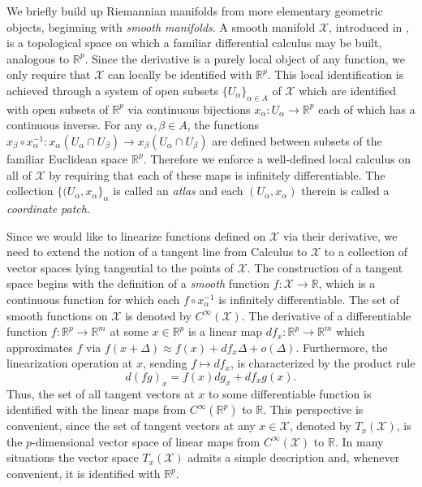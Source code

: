 \documentclass[anon,12pt]{colt2021} %
\newcommand{\rr}{{\mathbb{R}}}
\newcommand{\rrflex}[1]{{\ensuremath{\rr^{#1}
}}}
\newcommand{\rrm}{{\rrflex{m}}}
\newcommand{\rrp}{{\rrflex{p}}}
\newcommand{\xxx}{\mathcal{X}}
\begin{document}
We briefly build up Riemannian manifolds from more elementary geometric objects, beginning with \textit{smooth manifolds}.  A smooth manifold $\xxx$, introduced in \cite{RiemannOriginal}, is a topological space on which a familiar differential calculus may be built, analogous to $\rrp$.  Since the derivative is a purely local object of any function, we only require that $\xxx$ can locally be identified with $\rrp$.  This local identification is achieved through a system of open subsets $\{U_{\alpha}\}_{\alpha \in A}$ of $\xxx$ which are identified with open subsets of $\rrp$ via continuous bijections $x_{\alpha}:U_{\alpha}\rightarrow \rrp$ each of which has a continuous inverse.  For any $\alpha,\beta\in A$, the functions $x_{\beta}\circ x_{\alpha}^{-1}:x_{\alpha}(U_{\alpha}\cap U_{\beta})\rightarrow 
x_{\beta}(U_{\alpha}\cap U_{\beta})
$ are defined between subsets of the familiar Euclidean space $\rrp$. Therefore we enforce a well-defined local calculus on all of $\xxx$ by requiring that each of these maps is infinitely differentiable.  The collection $\{(U_{\alpha},x_{\alpha}\}_{\alpha}$ is called an \textit{atlas} and each $(U_{\alpha},x_{\alpha})$ therein is called a \textit{coordinate patch}.  

Since we would like to linearize functions defined on $\xxx$ via their derivative, we need to extend the notion of a tangent line from Calculus to $\xxx$ to a collection of vector spaces lying tangential to the points of $\xxx$.  The construction of a tangent space begins with the definition of a \textit{smooth} function $f:\xxx\rightarrow\rr$, which is a continuous function for which each $f\circ x_{\alpha}^{-1}$ is infinitely differentiable.  The set of smooth functions on $\xxx$ is denoted by $C^{\infty}(\xxx)$. 
The derivative of a differentiable function $f:\rrp\rightarrow \rrm$ at some $x \in \rrp$ is a linear map $df_x:\rrp\rightarrow \rrm$ which approximates $f$ via $f(x+\Delta)\approx f(x)+df_x \Delta +o(\Delta)$.  Furthermore, the linearization operation at $x$, sending $f \mapsto df_x$, is characterized by the product rule
\begin{equation}
    d(fg)_x = f(x)dg_x + df_x g(x)
    .
\end{equation}
Thus, the set of all tangent vectors at $x$ to some differentiable function is identified with the linear maps from $C^{\infty}(\rrp)$ to $\rr$. This perspective is convenient, since the set of tangent vectors at any $x \in \xxx$, denoted by $T_x(\xxx)$, is the $p$-dimensional vector space of linear maps from $C^{\infty}(\xxx)$ to $\rr$.  In many situations the vector space $T_x(\xxx)$ admits a simple description and, whenever convenient, it is identified with $\rrp$.  
\end{document}
